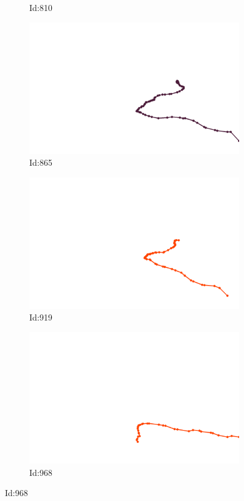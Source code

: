 \documentclass[12pt,twoside]{report}
\begin{document}
\begin{figure}
\begin{subfigure}[b]{0.20\textwidth}
\caption{Id:810}
\end{subfigure}
\begin{subfigure}[b]{0.20\textwidth}
\centering
\includegraphics[width=\textwidth]{../trajectories/865.png}
\caption{Id:865}
\end{subfigure}
\begin{subfigure}[b]{0.20\textwidth}
\centering
\includegraphics[width=\textwidth]{../trajectories/919.png}
\caption{Id:919}
\end{subfigure}
\begin{subfigure}[b]{0.20\textwidth}
\centering
\includegraphics[width=\textwidth]{../trajectories/968.png}
\caption{Id:968}
\end{subfigure}
\end{figure}
\end{document}
